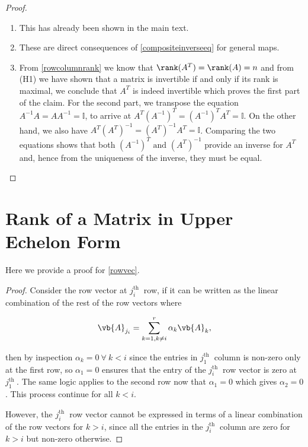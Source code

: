 \documentclass[a4paper,12pt]{report}
\begin{document}
\begin{appendices}
\begin{proof}
    \begin{enumerate}[label=(H\arabic*)]
        \item This has already been shown in the main text.
        \item These are direct consequences of \cref{compositeinverseeq} for general maps.
        \item From \cref{rowcolumnrank} we know that \(\rank (A^{T} ) = \rank (A) = n\) and from (H1) we have shown that a matrix is invertible if and only if its rank is maximal, we conclude that \(A^{T} \) is indeed invertible which proves the first part of the claim. For the second part, we transpose the equation \(A^{-1} A = AA^{-1} = \mathbb{I}\), to arrive at \(A^{T} (A^{-1} )^{T} = (A^{-1} )^{T}A^{T} = \mathbb{I}    \). On the other hand, we also have \(A^{T}(A^{T} )^{-1} = (A^{T} )^{-1} A^{T} =\mathbb{I} \). Comparing the two equations shows that both \((A^{-1} )^{T} \text { and } (A^{T} )^{-1}  \) provide an inverse for \(A^{T} \) and, hence from the uniqueness of the inverse, they must be equal.       
    \end{enumerate}
\end{proof}
    
\section{Rank of a Matrix in Upper Echelon Form} \label{rowvecapp} 

Here we provide a proof for \cref{rowvec}.

\begin{proof}
    Consider the row vector at \(j_{i} ^{\text{th }} \) row, if it can be written as the linear combination of the rest of the row vectors where
    
    \begin{equation}
        \vb{A} _{j_{i} } = \sum_{k=1, k \neq i}^{r} \alpha _{k} \vb{A} _{k},  
    \end{equation}
    
    then by inspection \(\alpha _{k} = 0 ~\forall ~ k<i \) since the entries in \(j_{1}^{\text{th }}  \) column is non-zero only at the first row, so \(\alpha _{1} = 0\) ensures that the entry of the \(j_{i}^ {\text{th }}  \) row vector is zero at \(j_{1}^{\text{th }}  \). The same logic applies to the second row now that \(\alpha _{1} = 0 \) which gives \(\alpha _{2} =0\). This process continue for all \(k < i\). 
    
    However, the \(j_{i}^{\text{th }}  \) row vector cannot be expressed in terms of a linear combination of the row vectors for \(k > i \), since all the entries in the \(j_{i}^{\text{th }}  \) column are zero for \(k > i\) but non-zero otherwise. 
    

\end{proof}
\end{appendices}
\end{document}
